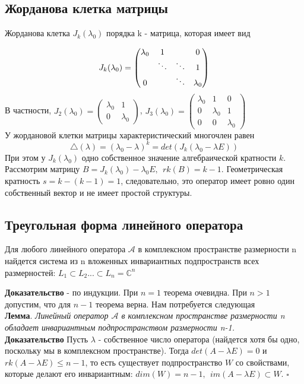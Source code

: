 \subsection{Жорданова клетка матрицы}
\begin{defin}
Жорданова клетка $J_k(\lambda_0)$ порядка k - матрица, которая имеет вид 
\end{defin}
$$J_k(\lambda_0)=\begin{pmatrix}\lambda_0&1&&\large{0}\\&\ddots&\ddots&1\\
\large{0}&&\ddots&\lambda_0\end{pmatrix}$$
В частности, $J_2(\lambda_0)=\begin{pmatrix}\lambda_0&1\\0&\lambda_0
		\end{pmatrix}$, $J_3(\lambda_0)=\begin{pmatrix}\lambda_0&1&0\\0&
\lambda_0&1\\0&0&\lambda_0\end{pmatrix}$\\
У жордановой клетки матрицы характеристический многочлен равен $$\triangle
(\lambda)=(\lambda_0-\lambda)^k=det(J_k(\lambda_0-\lambda E))$$
При этом у $J_k(\lambda_0)$ одно собственное значение алгебраической кратности
$k$.\\
Рассмотрим матрицу $B=J_k(\lambda_0)-\lambda_0E,~~rk(B)=k-1$. Геометрическая 
кратность $s=k-(k-1)=1$, следовательно, это оператор имеет ровно один 
собственный вектор и не имеет простой структуры.


\subsection{Треугольная форма линейного оператора}
\begin{theor}\label{sistinvpod}
Для любого линейного оператора $\mathcal A$ в комплексном пространстве 
размерности n найдется система из n вложенных инвариантных подпространств всех
размерностей: $L_1\subset L_2...\subset L_n=\mathbb C^n$
\end{theor}
\textbf{Доказательство} - по индукции. При $n=1$ теорема очевидна. При $n>1$ 
допустим, что для $n-1$ теорема верна. Нам потребуется следующая\\
\textbf{Лемма}. \textit{Линейный оператор $\mathcal A$ в комплексном 
пространстве размерности n обладает инвариантным подпространством размерности
n-1.}\\
\textbf{Доказательство} Пусть $\lambda$ - собственное число  оператора 
(найдется хотя бы одно, поскольку мы в комплексном пространстве). Тогда 
$det(A-\lambda E)=0$ и $rk(A-\lambda E)\leqslant n-1$, то есть существует
подпространство $W$ со свойствами, которые делают его инвариантным: 
$dim(W)=n-1,~~im(A-\lambda E)\subset W$. $\square$ 


